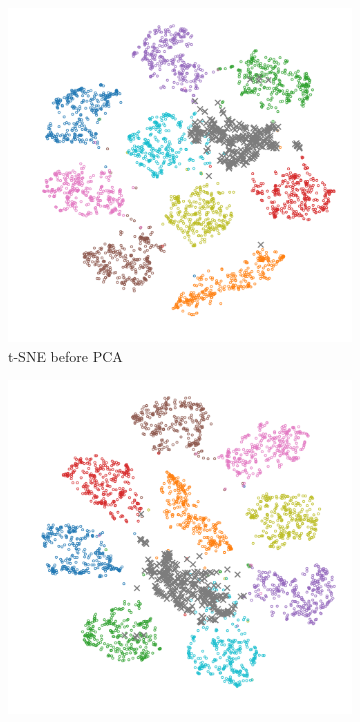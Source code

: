 \documentclass[10pt]{article}
\begin{document}
\begin{figure}[H]
    \centering
    \begin{subfigure}{.49\textwidth}
        \centering
        \includegraphics[width=\textwidth]{MNIST_t-SNE_wo_cl_7_before}
        \caption{\gls{t-SNE} before \gls{PCA}}
    \end{subfigure}
    \begin{subfigure}{.5\textwidth}
        \centering
        \includegraphics[width=\textwidth]{MNIST_t-SNE_wo_cl_7_after}

\end{subfigure}
\end{figure}
\end{document}
